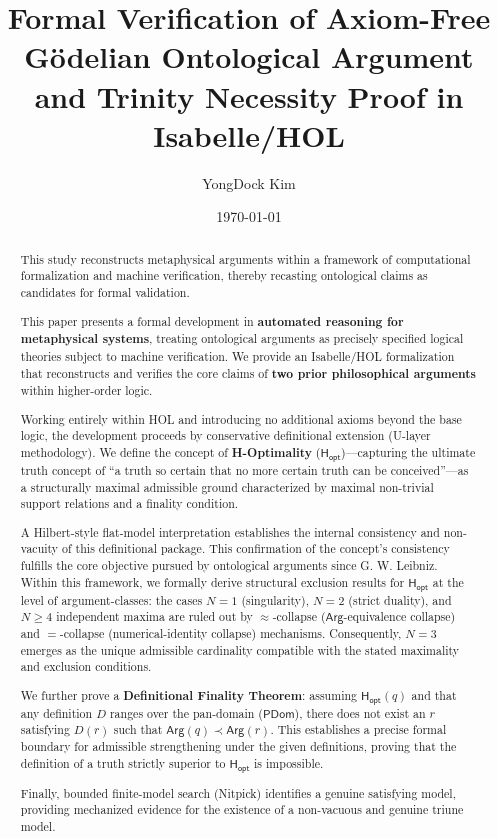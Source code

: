 \documentclass[a4paper, 11pt]{article}
\title{\textbf{Formal Verification of Axiom-Free G\"odelian Ontological Argument \\ and Trinity Necessity Proof in Isabelle/HOL}}
\author{YongDock Kim}
\date{\today}
\theoremstyle{plain}
\theoremstyle{definition}
\newcommand{\Arg}{\mathsf{Arg}}           %
\newcommand{\Hopt}{\mathsf{H_{opt}}}       %
\newcommand{\PDom}{\mathsf{PDom}}         %
\begin{document}
\maketitle

\begin{abstract}
This study reconstructs metaphysical arguments within a framework of computational formalization and machine verification, thereby recasting ontological claims as candidates for formal validation.

This paper presents a formal development in \textbf{automated reasoning for metaphysical systems}, treating ontological arguments as precisely specified logical theories subject to machine verification. We provide an Isabelle/HOL formalization that reconstructs and verifies the core claims of \textbf{two prior philosophical arguments} within higher-order logic.

Working entirely within HOL and introducing no additional axioms beyond the base logic, the development proceeds by conservative definitional extension (U-layer methodology). We define the concept of \textbf{H-Optimality} ($\Hopt$)---capturing the ultimate truth concept of ``a truth so certain that no more certain truth can be conceived''---as a structurally maximal admissible ground characterized by maximal non-trivial support relations and a finality condition.

A Hilbert-style flat-model interpretation establishes the internal consistency and non-vacuity of this definitional package. This confirmation of the concept's consistency fulfills the core objective pursued by ontological arguments since G. W. Leibniz. Within this framework, we formally derive structural exclusion results for $\Hopt$ at the level of argument-classes: the cases $N=1$ (singularity), $N=2$ (strict duality), and $N \ge 4$ independent maxima are ruled out by $\approx$-collapse ($\Arg$-equivalence collapse) and $=$-collapse (numerical-identity collapse) mechanisms. Consequently, $N=3$ emerges as the unique admissible cardinality compatible with the stated maximality and exclusion conditions.

We further prove a \textbf{Definitional Finality Theorem}: assuming $\Hopt(q)$ and that any definition $D$ ranges over the pan-domain ($\PDom$), there does not exist an $r$ satisfying $D(r)$ such that $\Arg(q) \prec \Arg(r)$. This establishes a precise formal boundary for admissible strengthening under the given definitions, proving that the definition of a truth strictly superior to $\Hopt$ is impossible.

Finally, bounded finite-model search (Nitpick) identifies a genuine satisfying model, providing mechanized evidence for the existence of a non-vacuous and genuine triune model.
\end{abstract}
\end{document}
